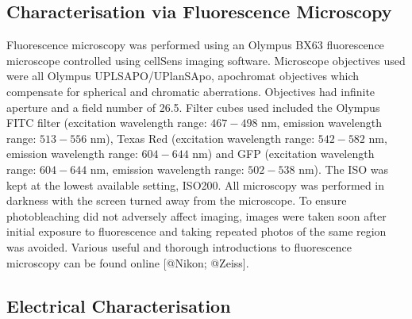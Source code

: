 \documentclass[
  letterpaper,
  DIV=11,
  numbers=noendperiod]{scrartcl}
\begin{document}
\hypertarget{sec-fluorescence-characterisation}{%
\subsection{Characterisation via Fluorescence
Microscopy}\label{sec-fluorescence-characterisation}}

Fluorescence microscopy was performed using an Olympus BX63 fluorescence
microscope controlled using cellSens imaging software. Microscope
objectives used were all Olympus UPLSAPO/UPlanSApo, apochromat
objectives which compensate for spherical and chromatic aberrations.
Objectives had infinite aperture and a field number of 26.5. Filter
cubes used included the Olympus FITC filter (excitation wavelength
range: \(467-498\) nm, emission wavelength range: \(513-556\) nm), Texas
Red (excitation wavelength range: \(542-582\) nm, emission wavelength
range: \(604-644\) nm) and GFP (excitation wavelength range: \(604-644\)
nm, emission wavelength range: \(502-538\) nm). The ISO was kept at the
lowest available setting, ISO200. All microscopy was performed in
darkness with the screen turned away from the microscope. To ensure
photobleaching did not adversely affect imaging, images were taken soon
after initial exposure to fluorescence and taking repeated photos of the
same region was avoided. Various useful and thorough introductions to
fluorescence microscopy can be found online {[}@Nikon; @Zeiss{]}.

\hypertarget{sec-electrical-characterisation}{%
\subsection{Electrical
Characterisation}\label{sec-electrical-characterisation}}
\end{document}
